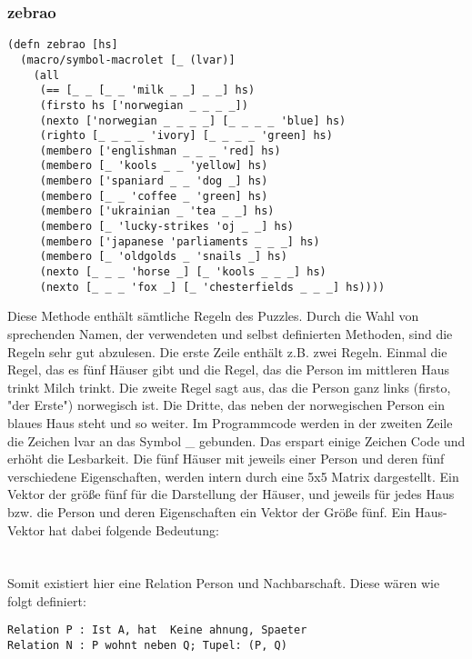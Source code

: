 \subsubsection{zebrao}

\begin{lstlisting}
(defn zebrao [hs]
  (macro/symbol-macrolet [_ (lvar)]
    (all
     (== [_ _ [_ _ 'milk _ _] _ _] hs)
     (firsto hs ['norwegian _ _ _ _])
     (nexto ['norwegian _ _ _ _] [_ _ _ _ 'blue] hs)
     (righto [_ _ _ _ 'ivory] [_ _ _ _ 'green] hs)
     (membero ['englishman _ _ _ 'red] hs)
     (membero [_ 'kools _ _ 'yellow] hs)
     (membero ['spaniard _ _ 'dog _] hs)
     (membero [_ _ 'coffee _ 'green] hs)
     (membero ['ukrainian _ 'tea _ _] hs)
     (membero [_ 'lucky-strikes 'oj _ _] hs)
     (membero ['japanese 'parliaments _ _ _] hs)
     (membero [_ 'oldgolds _ 'snails _] hs)
     (nexto [_ _ _ 'horse _] [_ 'kools _ _ _] hs)
     (nexto [_ _ _ 'fox _] [_ 'chesterfields _ _ _] hs))))
\end{lstlisting}

Diese Methode enthält sämtliche Regeln des Puzzles. Durch die Wahl von sprechenden Namen, der verwendeten und selbst definierten Methoden, sind die Regeln sehr gut abzulesen. Die erste Zeile enthält z.B. zwei Regeln. Einmal die Regel, das es fünf Häuser gibt und die Regel, das die Person im mittleren Haus trinkt Milch trinkt. Die zweite Regel sagt aus, das die Person ganz links (firsto, "der Erste") norwegisch ist. Die Dritte, das neben der norwegischen Person ein blaues Haus steht und so weiter.
Im Programmcode werden in der zweiten Zeile die Zeichen \dq{}lvar\dq{} an das Symbol \dq{}\_\dq{} gebunden. Das erspart einige Zeichen Code und erhöht die Lesbarkeit. 
Die fünf Häuser mit jeweils einer Person und deren fünf verschiedene Eigenschaften, werden intern durch eine 5x5 Matrix dargestellt. Ein Vektor der größe fünf für die Darstellung der Häuser, und jeweils für jedes Haus bzw. die Person und deren Eigenschaften ein Vektor der Größe fünf. Ein \dq{}Haus-Vektor\dq{} hat dabei folgende Bedeutung:
\\
\\
\\

Somit existiert hier eine Relation \dq{}Person\dq{} und \dq{}Nachbarschaft\dq{}. Diese wären wie folgt definiert:
\begin{lstlisting}
Relation P : Ist A, hat  Keine ahnung, Spaeter 
Relation N : P wohnt neben Q; Tupel: (P, Q)
\end{lstlisting}

